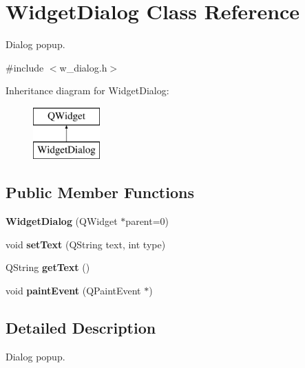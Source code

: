 \hypertarget{class_widget_dialog}{}\section{Widget\+Dialog Class Reference}
\label{class_widget_dialog}


Dialog popup.  




{\ttfamily \#include $<$w\+\_\+dialog.\+h$>$}

Inheritance diagram for Widget\+Dialog\+:\begin{figure}[H]
\begin{center}
\leavevmode
\includegraphics[height=2.000000cm]{class_widget_dialog}
\end{center}
\end{figure}
\subsection*{Public Member Functions}
\begin{DoxyCompactItemize}
\item 
\hypertarget{class_widget_dialog_aa282c5193c1318f92bd21fe77a3f66bb}{}{\bfseries Widget\+Dialog} (Q\+Widget $\ast$parent=0)\label{class_widget_dialog_aa282c5193c1318f92bd21fe77a3f66bb}

\item 
\hypertarget{class_widget_dialog_ad4ee3d228612e11780f73839db9150a9}{}void {\bfseries set\+Text} (Q\+String text, int type)\label{class_widget_dialog_ad4ee3d228612e11780f73839db9150a9}

\item 
\hypertarget{class_widget_dialog_ab904d7133d4de10e637cc48aac3a3ecc}{}Q\+String {\bfseries get\+Text} ()\label{class_widget_dialog_ab904d7133d4de10e637cc48aac3a3ecc}

\item 
\hypertarget{class_widget_dialog_aa3af6ec9a3e6dc42e82f86a851994614}{}void {\bfseries paint\+Event} (Q\+Paint\+Event $\ast$)\label{class_widget_dialog_aa3af6ec9a3e6dc42e82f86a851994614}

\end{DoxyCompactItemize}


\subsection{Detailed Description}
Dialog popup. 

